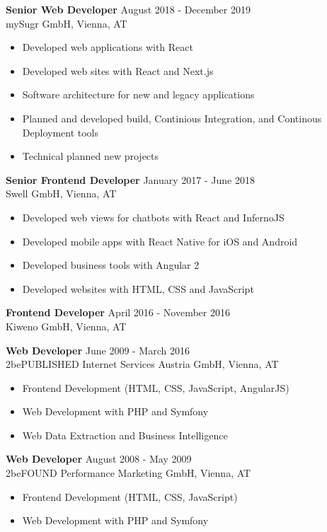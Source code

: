 \documentclass[margin]{res}
\begin{document}
\begin{resume}
\textbf{Senior Web Developer} \hfill August 2018 - December 2019 \\
  mySugr GmbH, Vienna, AT
  \begin{itemize}
    \item Developed web applications with React
    \item Developed web sites with React and Next.js
    \item Software architecture for new and legacy applications
    \item Planned and developed build, Continious Integration, and Continous Deployment tools
    \item Technical planned new projects
  \end{itemize}

\textbf{Senior Frontend Developer} \hfill January 2017 - June 2018 \\
  Swell GmbH, Vienna, AT
  \begin{itemize}
    \item Developed web views for chatbots with React and InfernoJS
    \item Developed mobile apps with React Native for iOS and Android
    \item Developed business tools with Angular 2
    \item Developed websites with HTML, CSS and JavaScript
  \end{itemize}

\textbf{Frontend Developer} \hfill April 2016 - November 2016 \\
  Kiweno GmbH, Vienna, AT

\textbf{Web Developer} \hfill June 2009 - March 2016 \\
  2bePUBLISHED Internet Services Austria GmbH, Vienna, AT
  \begin{itemize}  \itemsep -2pt %
    \item Frontend Development (HTML, CSS, JavaScript, AngularJS)
    \item Web Development with PHP and Symfony
    \item Web Data Extraction and Business Intelligence
  \end{itemize}

\textbf{Web Developer} \hfill August 2008 - May 2009 \\
  2beFOUND Performance Marketing GmbH, Vienna, AT
  \begin{itemize}  \itemsep -2pt
    \item Frontend Development (HTML, CSS, JavaScript)
    \item Web Development with PHP and Symfony
  \end{itemize}


\end{resume}
\end{document}
